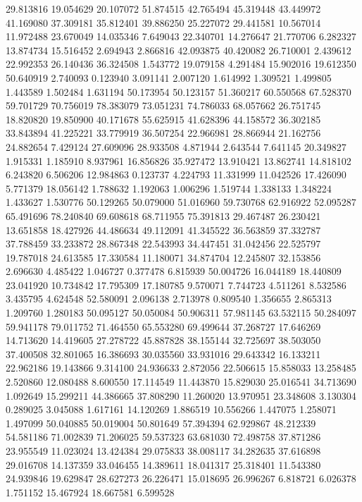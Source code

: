 29.813816
19.054629
20.107072
51.874515
42.765494
45.319448
43.449972
41.169080
37.309181
35.812401
39.886250
25.227072
29.441581
10.567014
11.972488
23.670049
14.035346
7.649043
22.340701
14.276647
21.770706
6.282327
13.874734
15.516452
2.694943
2.866816
42.093875
40.420082
26.710001
2.439612
22.992353
26.140436
36.324508
1.543772
19.079158
4.291484
15.902016
19.612350
50.640919
2.740093
0.123940
3.091141
2.007120
1.614992
1.309521
1.499805
1.443589
1.502484
1.631194
50.173954
50.123157
51.360217
60.550568
67.528370
59.701729
70.756019
78.383079
73.051231
74.786033
68.057662
26.751745
18.820820
19.850900
40.171678
55.625915
41.628396
44.158572
36.302185
33.843894
41.225221
33.779919
36.507254
22.966981
28.866944
21.162756
24.882654
7.429124
27.609096
28.933508
4.871944
2.643544
7.641145
20.349827
1.915331
1.185910
8.937961
16.856826
35.927472
13.910421
13.862741
14.818102
6.243820
6.506206
12.984863
0.123737
4.224793
11.331999
11.042526
17.426090
5.771379
18.056142
1.788632
1.192063
1.006296
1.519744
1.338133
1.348224
1.433627
1.530776
50.129265
50.079000
51.016960
59.730768
62.916922
52.095287
65.491696
78.240840
69.608618
68.711955
75.391813
29.467487
26.230421
13.651858
18.427926
44.486634
49.112091
41.345522
36.563859
37.332787
37.788459
33.233872
28.867348
22.543993
34.447451
31.042456
22.525797
19.787018
24.613585
17.330584
11.180071
34.874704
12.245807
32.153856
2.696630
4.485422
1.046727
0.377478
6.815939
50.004726
16.044189
18.440809
23.041920
10.734842
17.795309
17.180785
9.570071
7.744723
4.511261
8.532586
3.435795
4.624548
52.580091
2.096138
2.713978
0.809540
1.356655
2.865313
1.209760
1.280183
50.095127
50.050084
50.906311
57.981145
63.532115
50.284097
59.941178
79.011752
71.464550
65.553280
69.499644
37.268727
17.646269
14.713620
14.419605
27.278722
45.887828
38.155144
32.725697
38.503050
37.400508
32.801065
16.386693
30.035560
33.931016
29.643342
16.133211
22.962186
19.143866
9.314100
24.936633
2.872056
22.506615
15.858033
13.258485
2.520860
12.080488
8.600550
17.114549
11.443870
15.829030
25.016541
34.713690
1.092649
15.299211
44.386665
37.808290
11.260020
13.970951
23.348608
3.130304
0.289025
3.045088
1.617161
14.120269
1.886519
10.556266
1.447075
1.258071
1.497099
50.040885
50.019004
50.801649
57.394394
62.929867
48.212339
54.581186
71.002839
71.206025
59.537323
63.681030
72.498758
37.871286
23.955549
11.023024
13.424384
29.075833
38.008117
34.282635
37.616898
29.016708
14.137359
33.046455
14.389611
18.041317
25.318401
11.543380
24.939846
19.629847
28.627273
26.226471
15.018695
26.996267
6.818721
6.026378
1.751152
15.467924
18.667581
6.599528
